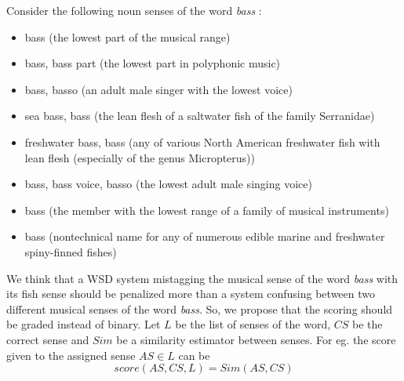 \begin{example}
Consider the following noun senses of the word \textit{bass} :
\begin{itemize}
\item bass (the lowest part of the musical range)
\item bass, bass part (the lowest part in polyphonic music)
\item bass, basso (an adult male singer with the lowest voice)
\item sea bass, bass (the lean flesh of a saltwater fish of the family Serranidae)
\item freshwater bass, bass (any of various North American freshwater fish with lean flesh (especially of the genus Micropterus))
\item bass, bass voice, basso (the lowest adult male singing voice)
\item bass (the member with the lowest range of a family of musical instruments)
\item bass (nontechnical name for any of numerous edible marine and freshwater spiny-finned fishes)
\end{itemize}
\end{example}

We think that a WSD system mistagging the musical sense of the word \textit{bass} with its fish sense should be penalized more than a system confusing between two different musical senses of the word \textit{bass}. So, we propose that the scoring should be graded instead of binary. Let $L$ be the list of senses of the word, $CS$ be the correct sense and $Sim$ be a similarity estimator between senses. For eg. the score given to the assigned sense $AS \in L$ can be
\begin{equation}
\label{eq:proposedFramework}
score(AS,CS,L) = {Sim(AS,CS)}
\end{equation}
